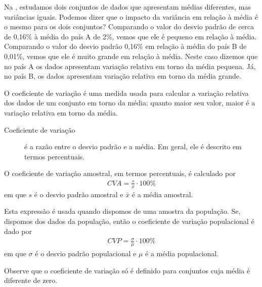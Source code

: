 Na , estudamos dois conjuntos de dados que apresentam médias diferentes, mas variâncias iguais. Podemos dizer que o impacto da variância em relação à média é o mesmo para os dois conjuntos? Comparando o valor do desvio padrão de cerca de 0,16\% à média do país A de 2\%, vemos que ele é pequeno em relação à média. Comparando o valor do desvio padrão 0,16\% em relação à média do país B de 0,01\%, vemos que ele é muito grande em relação à média. Neste caso dizemos que no país A os dados apresentam variação relativa em torno da média pequena. Já, no país B, os dados apresentam variação relativa em torno da média grande.

O coeficiente de variação é uma medida usada para calcular a variação relativa dos dados de um conjunto em torno da média: quanto maior seu valor, maior é a variação relativa em torno da média.
\begin{description}
\item[{Coeficiente de variação}] \leavevmode{}\label{\detokenize{PE104-4:term-coeficiente-de-variacao}}
é a razão entre o desvio padrão e a média. Em geral, ele é descrito em termos percentuais.

\end{description}

O coeficiente de variação amostral, em termos percentuais, é calculado  por
\begin{equation*}
\begin{split}CVA=\frac{s}{\bar{x}}\cdot 100 \%\end{split}
\end{equation*}
em que \(s\) é o desvio padrão amostral e \(\bar{x}\) é a média amostral.

Esta expressão é usada quando dispomos de uma amostra da população. Se, dispomos dos dados da população, então o coeficiente de variação populacional é dado por
\begin{equation*}
\begin{split}CVP=\frac{{\sigma}}{\mu}\cdot 100\%\end{split}
\end{equation*}
em que \(\sigma\) é o desvio padrão populacional e \(\mu\) é a média populacional.

Observe que o coeficiente de variação só é definido para conjuntos cuja média é diferente de zero.


